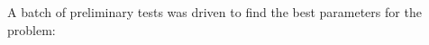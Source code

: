 A batch of preliminary tests was driven to find the best parameters for the
problem:
\begin{center}
  
\end{center}
